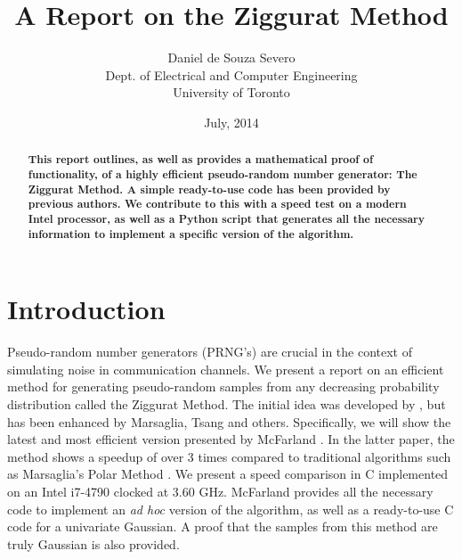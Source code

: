 \documentclass[11pt,onecolumn]{article}
\begin{document}
\title{A Report on the Ziggurat Method}
\author{Daniel de Souza Severo\\
Dept. of Electrical and Computer Engineering\\
University of Toronto}
\date{July, 2014}
\maketitle
\begin{abstract}

\textbf{This report outlines, as well as provides a mathematical proof of functionality, of a highly efficient pseudo-random number generator: The Ziggurat Method. A simple ready-to-use code has been provided by previous authors. We contribute to this with a speed test on a modern Intel processor, as well as a Python script that generates all the necessary information to implement a specific version of the algorithm.}
\end{abstract}

\section{Introduction}
Pseudo-random number generators (PRNG's) are crucial in the context of simulating noise in communication channels. We present a report on an efficient method for generating pseudo-random samples from any decreasing probability distribution called the Ziggurat Method. The initial idea was developed by \cite{marsaglia}, but has been enhanced by Marsaglia, Tsang \cite{marsaglia&tsang} and others. Specifically, we will show the latest and most efficient version presented by McFarland \cite{mcfarland}. In the latter paper, the method shows a speedup of over 3 times compared to traditional algorithms such as Marsaglia's Polar Method \cite{marsagliapolar}. We present a speed comparison in C implemented on an Intel i7-4790 clocked at 3.60 GHz. McFarland \cite{mcfarland} provides all the necessary code to implement an \textit{ad hoc} version of the algorithm, as well as a ready-to-use C code for a univariate Gaussian. A proof that the samples from this method are truly Gaussian is also provided.
\end{document}

